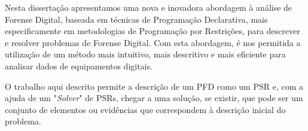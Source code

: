 \begin{tueSUMARIO}
Nesta dissertação apresentamos uma nova e inovadora abordagem à análise de Forense Digital, baseada em técnicas de Programação Declarativa, mais especificamente em metodologias de Programação por Restrições, para descrever e resolver problemas de Forense Digital. Com esta abordagem, é nos permitida a utilização de um método mais intuitivo, mais descritivo e mais eficiente para analisar dados de equipamentos digitais.

O trabalho aqui descrito permite a descrição de um \acf{PFD} como um \acf{PSR} e, com a ajuda de um "\textit{Solver}" de \acp{PSR}, chegar a uma solução, se existir, que pode ser um conjunto de elementos ou evidências que correspondem à descrição inicial do problema.
\end{tueSUMARIO}
